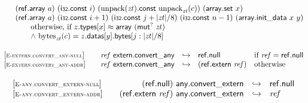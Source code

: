 $$\begin{array}[t]{@{}lrcl@{}l@{}}
& \multicolumn{4}{@{}l@{}}{\quad
\begin{array}[t]{@{}l@{}l@{}l@{}}
\begin{array}[t]{@{}l@{}} (\mathsf{ref{.}array}~a)~(\mathsf{i{\scriptstyle 32}}{.}\mathsf{const}~i)~({\mathrm{unpack}}({\mathit{zt}}){.}\mathsf{const}~{{\mathrm{unpack}}}_{{\mathit{zt}}}(c))~(\mathsf{array{.}set}~x) \\
  (\mathsf{ref{.}array}~a)~(\mathsf{i{\scriptstyle 32}}{.}\mathsf{const}~i + 1)~(\mathsf{i{\scriptstyle 32}}{.}\mathsf{const}~j + {|{\mathit{zt}}|} / 8)~(\mathsf{i{\scriptstyle 32}}{.}\mathsf{const}~n - 1)~(\mathsf{array{.}init\_data}~x~y) \end{array} & & \\
 \multicolumn{3}{@{}l@{}}{\quad
\begin{array}[t]{@{}l@{}}
\quad
\begin{array}[t]{@{}l@{}}
\mbox{otherwise, if}~ z{.}\mathsf{types}{}[x] \approx \mathsf{array}~({\mathsf{mut}^?}~{\mathit{zt}}) \\
{\land}~ {{\mathrm{bytes}}}_{{\mathit{zt}}}(c) = z{.}\mathsf{datas}{}[y]{.}\mathsf{bytes}{}[j : {|{\mathit{zt}}|} / 8] \\
\end{array} \\
\end{array}
} \\
\end{array}
} \\
\end{array}
$$

\vspace{1ex}

$$
\begin{array}[t]{@{}lrcl@{}l@{}}
{[\textsc{\scriptsize E{-}extern.convert\_any{-}null}]} \quad & {\mathit{ref}}~\mathsf{extern{.}convert\_any} & \hookrightarrow & \mathsf{ref{.}null} & \quad \mbox{if}~ {\mathit{ref}} = \mathsf{ref{.}null} \\
{[\textsc{\scriptsize E{-}extern.convert\_any{-}addr}]} \quad & {\mathit{ref}}~\mathsf{extern{.}convert\_any} & \hookrightarrow & (\mathsf{ref{.}extern}~{\mathit{ref}}) & \quad \mbox{otherwise} \\
\end{array}
$$

\vspace{1ex}

$$
\begin{array}[t]{@{}lrcl@{}l@{}}
{[\textsc{\scriptsize E{-}any.convert\_extern{-}null}]} \quad & (\mathsf{ref{.}null})~\mathsf{any{.}convert\_extern} & \hookrightarrow & \mathsf{ref{.}null} \\
{[\textsc{\scriptsize E{-}any.convert\_extern{-}addr}]} \quad & (\mathsf{ref{.}extern}~{\mathit{ref}})~\mathsf{any{.}convert\_extern} & \hookrightarrow & {\mathit{ref}} \\
\end{array}
$$

